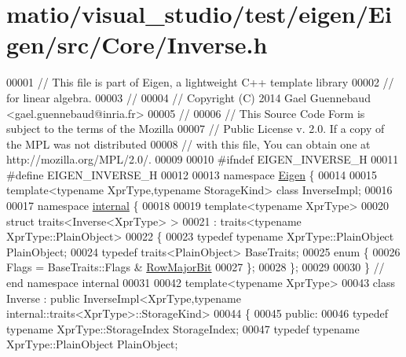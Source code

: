 \hypertarget{matio_2visual__studio_2test_2eigen_2_eigen_2src_2_core_2_inverse_8h_source}{}\section{matio/visual\+\_\+studio/test/eigen/\+Eigen/src/\+Core/\+Inverse.h}
\label{matio_2visual__studio_2test_2eigen_2_eigen_2src_2_core_2_inverse_8h_source}

\begin{DoxyCode}
00001 \textcolor{comment}{// This file is part of Eigen, a lightweight C++ template library}
00002 \textcolor{comment}{// for linear algebra.}
00003 \textcolor{comment}{//}
00004 \textcolor{comment}{// Copyright (C) 2014 Gael Guennebaud <gael.guennebaud@inria.fr>}
00005 \textcolor{comment}{//}
00006 \textcolor{comment}{// This Source Code Form is subject to the terms of the Mozilla}
00007 \textcolor{comment}{// Public License v. 2.0. If a copy of the MPL was not distributed}
00008 \textcolor{comment}{// with this file, You can obtain one at http://mozilla.org/MPL/2.0/.}
00009 
00010 \textcolor{preprocessor}{#ifndef EIGEN\_INVERSE\_H}
00011 \textcolor{preprocessor}{#define EIGEN\_INVERSE\_H}
00012 
00013 \textcolor{keyword}{namespace }\hyperlink{namespace_eigen}{Eigen} \{ 
00014 
00015 \textcolor{keyword}{template}<\textcolor{keyword}{typename} XprType,\textcolor{keyword}{typename} StorageKind> \textcolor{keyword}{class }InverseImpl;
00016 
00017 \textcolor{keyword}{namespace }\hyperlink{namespaceinternal}{internal} \{
00018 
00019 \textcolor{keyword}{template}<\textcolor{keyword}{typename} XprType>
00020 \textcolor{keyword}{struct }traits<Inverse<XprType> >
00021   : traits<typename XprType::PlainObject>
00022 \{
00023   \textcolor{keyword}{typedef} \textcolor{keyword}{typename} XprType::PlainObject PlainObject;
00024   \textcolor{keyword}{typedef} traits<PlainObject> BaseTraits;
00025   \textcolor{keyword}{enum} \{
00026     Flags = BaseTraits::Flags & \hyperlink{group__flags_gae4f56c2a60bbe4bd2e44c5b19cbe8762}{RowMajorBit}
00027   \};
00028 \};
00029 
00030 \} \textcolor{comment}{// end namespace internal}
00031 
00042 \textcolor{keyword}{template}<\textcolor{keyword}{typename} XprType>
00043 \textcolor{keyword}{class }Inverse : \textcolor{keyword}{public} InverseImpl<XprType,typename internal::traits<XprType>::StorageKind>
00044 \{
00045 \textcolor{keyword}{public}:
00046   \textcolor{keyword}{typedef} \textcolor{keyword}{typename} XprType::StorageIndex StorageIndex;
00047   \textcolor{keyword}{typedef} \textcolor{keyword}{typename} XprType::PlainObject                       PlainObject;

\end{DoxyCode}
